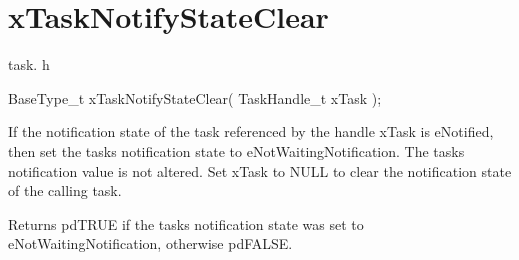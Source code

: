\hypertarget{group__x_task_notify_state_clear}{}\section{x\+Task\+Notify\+State\+Clear}
\label{group__x_task_notify_state_clear}
task. h 
\begin{DoxyPre}BaseType\_t xTaskNotifyStateClear( TaskHandle\_t xTask );\end{DoxyPre}


If the notification state of the task referenced by the handle x\+Task is e\+Notified, then set the task\textquotesingle{}s notification state to e\+Not\+Waiting\+Notification. The task\textquotesingle{}s notification value is not altered. Set x\+Task to N\+U\+LL to clear the notification state of the calling task.

\begin{DoxyReturn}{Returns}
pd\+T\+R\+UE if the task\textquotesingle{}s notification state was set to e\+Not\+Waiting\+Notification, otherwise pd\+F\+A\+L\+SE. 
\end{DoxyReturn}
